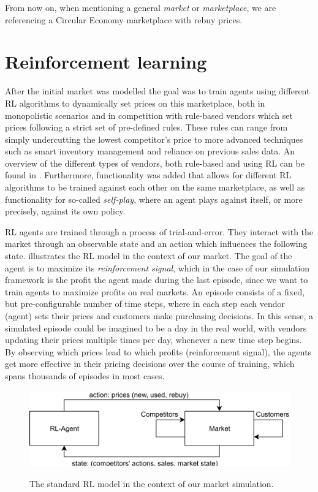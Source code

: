 From now on, when mentioning a general \emph{market} or \emph{marketplace}, we are referencing a Circular Economy marketplace with rebuy prices.

\section{Reinforcement learning}\label{sec:ReinforcementLearningIntroduction}

After the initial market was modelled the goal was to train agents using different RL algorithms to dynamically set prices on this marketplace, both in monopolistic scenarios and in competition with rule-based vendors which set prices following a strict set of pre-defined rules. These rules can range from simply undercutting the lowest competitor's price to more advanced techniques such as smart inventory management and reliance on previous sales data. An overview of the different types of vendors, both rule-based and using RL can be found in . Furthermore, functionality was added that allows for different RL algorithms to be trained against each other on the same marketplace, as well as functionality for so-called \emph{self-play}, where an agent plays against itself, or more precisely, against its own policy.

RL agents are trained through a process of trial-and-error. They interact with the market through an observable state and an action which influences the following state.  illustrates the RL model in the context of our market. The goal of the agent is to maximize its \emph{reinforcement signal}, which in the case of our simulation framework is the profit the agent made during the last episode, since we want to train agents to maximize profits on real markets. An episode consists of a fixed, but pre-configurable number of time steps, where in each step each vendor (agent) sets their prices and customers make purchasing decisions. In this sense, a simulated episode could be imagined to be a day in the real world, with vendors updating their prices multiple times per day, whenever a new time step begins. By observing which prices lead to which profits (reinforcement signal), the agents get more effective in their pricing decisions over the course of training, which spans thousands of episodes in most cases.

\begin{figure}[t]
	\centering
	\includegraphics[width = \textwidth]{images/RL_overview.png}\\
	\caption{The standard RL model in the context of our market simulation.}\label{fig:IntroRLDiagram}
\end{figure}